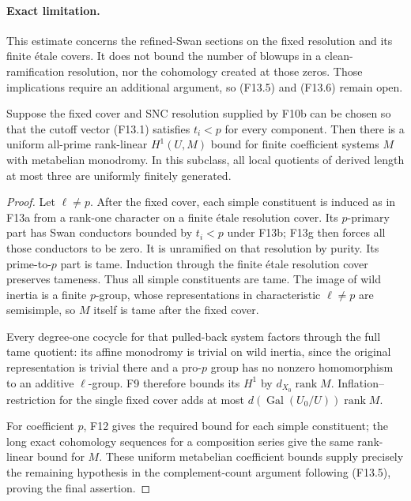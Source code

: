 \paragraph{Exact limitation.}
This estimate concerns the refined-Swan sections on the fixed
resolution and its finite \'etale covers. It does not bound the
number of blowups in a clean-ramification resolution, nor the
cohomology created at those zeros. Those implications require
an additional argument, so (F13.5) and (F13.6) remain open.


\begin{corollary}
Suppose the fixed cover and SNC resolution supplied by F10b can
be chosen so that the cutoff vector (F13.1) satisfies $t_i<p$
for every component. Then there is a uniform all-prime
rank-linear $H^1(U,M)$ bound for finite coefficient systems
$M$ with metabelian monodromy. In this subclass, all local
quotients of derived length at most three are uniformly finitely
generated.
\end{corollary}
\begin{proof}
Let $\ell\ne p$. After the fixed cover, each simple constituent
is induced as in F13a from a rank-one character on a finite
\'etale resolution cover. Its $p$-primary part has
Swan conductors bounded by $t_i<p$ under F13b; F13g then forces
all those conductors to be zero. It is unramified on that resolution by
purity. Its prime-to-$p$ part is tame. Induction through the
finite \'etale resolution cover preserves tameness. Thus all
simple constituents are tame. The image of wild inertia is a
finite $p$-group, whose representations in characteristic
$\ell\ne p$ are semisimple, so $M$ itself is tame after the
fixed cover.

Every degree-one cocycle for that pulled-back system factors
through the full tame quotient: its affine monodromy is trivial
on wild inertia, since the original representation is trivial
there and a pro-$p$ group has no nonzero homomorphism to an
additive $\ell$-group. F9 therefore bounds its $H^1$ by
$d_{X_0}\operatorname{rank}M$. Inflation--restriction for the
single fixed cover adds at most
$d(\operatorname{Gal}(U_0/U))\operatorname{rank}M$.

For coefficient $p$, F12 gives the required bound for each
simple constituent; the long exact cohomology sequences for a
composition series give the same rank-linear bound for $M$.
These uniform metabelian coefficient bounds supply precisely
the remaining hypothesis in the complement-count argument
following (F13.5), proving the final assertion.
\end{proof}

